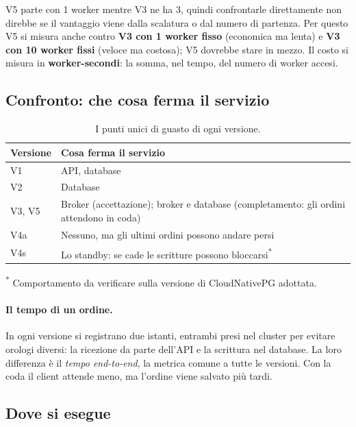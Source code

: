 V5 parte con 1 worker mentre V3 ne ha 3, quindi confrontarle direttamente non direbbe se il vantaggio viene dalla scalatura o dal numero di partenza. Per questo V5 si misura anche contro \textbf{V3 con 1 worker fisso} (economica ma lenta) e \textbf{V3 con 10 worker fissi} (veloce ma costosa); V5 dovrebbe stare in mezzo. Il costo si misura in \textbf{worker-secondi}: la somma, nel tempo, del numero di worker accesi.

\subsection{Confronto: che cosa ferma il servizio}

\begin{table}[H]
\centering
\caption{I punti unici di guasto di ogni versione.}
\label{tab:versioni}
\begin{tabularx}{\linewidth}{@{}lL@{}}
\toprule
\textbf{Versione} & \textbf{Cosa ferma il servizio} \\
\midrule
V1 & API, database \\
V2 & Database \\
V3, V5 & Broker (accettazione); broker e database (completamento: gli ordini attendono in coda) \\
V4a & Nessuno, ma gli ultimi ordini possono andare persi \\
V4s & Lo standby: se cade le scritture possono bloccarsi\textsuperscript{*} \\
\bottomrule
\end{tabularx}

\vspace{2pt}
{\footnotesize\textsuperscript{*} Comportamento da verificare sulla versione di CloudNativePG adottata.\par}
\end{table}

\paragraph{Il tempo di un ordine.} In ogni versione si registrano due istanti, entrambi presi nel cluster per evitare orologi diversi: la ricezione da parte dell'API e la scrittura nel database. La loro differenza è il \emph{tempo end-to-end}, la metrica comune a tutte le versioni. Con la coda il client attende meno, ma l'ordine viene salvato più tardi.

\subsection{Dove si esegue}

